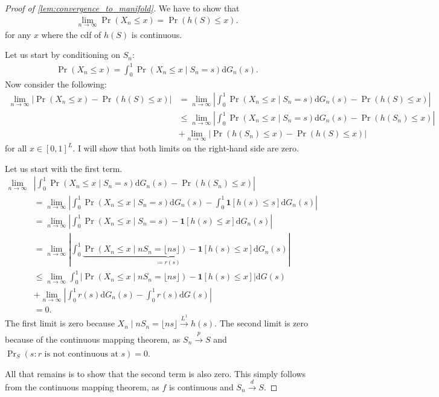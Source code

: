\documentclass[a4paper]{article}
\newcommand{\dG}{\mathrm{d}G}
\begin{document}
\begin{proof}[Proof of \cref{lem:convergence_to_manifold}]
    We have to show that
    \begin{align*}
        \lim_{n \to \infty} \Pr(X_n \leq x) = \Pr(h(S) \leq x).
    \end{align*}
    for any $x$ where the cdf of $h(S)$ is continuous.

    Let us start by conditioning on $S_n$:
    \begin{align*}
        \Pr(X_n \leq x) = \int_0^1 \Pr(X_n \leq x \mid S_n = s) \dG_n(s).
    \end{align*}
    Now consider the following:
    \begin{align*}
        \lim_{n \to \infty} \left| \Pr(X_n \leq x) - \Pr(h(S) \leq x) \right| &= \lim_{n \to \infty} \left| \int_0^1 \Pr(X_n \leq x \mid S_n = s) \dG_n(s) - \Pr(h(S) \leq x) \right| \\
        &\leq \lim_{n \to \infty} \left| \int_0^1 \Pr(X_n \leq x \mid S_n = s) \dG_n(s) - \Pr(h(S_n) \leq x) \right| \\
        &+ \lim_{n \to \infty} \left| \Pr(h(S_n) \leq x) - \Pr(h(S) \leq x) \right|
    \end{align*}
    for all $x \in [0, 1]^L$.
    I will show that both limits on the right-hand side are zero.

    Let us start with the first term.
    \begin{align*}
        \lim_{n \to \infty} &\left| \int_0^1 \Pr(X_n \leq x \mid S_n = s) \dG_n(s) - \Pr(h(S_n) \leq x) \right| \\
        &= \lim_{n \to \infty} \left| \int_0^1 \Pr(X_n \leq x \mid S_n = s) \dG_n(s) - \int_0^1 \mathbf{1}[h(s) \leq s] \dG_n(s) \right| \\
        &= \lim_{n \to \infty} \left| \int_0^1 \Pr(X_n \leq x \mid S_n = s) - \mathbf{1}[h(s) \leq x] \dG_n(s) \right| \\
        &= \lim_{n \to \infty} \left| \int_0^1 \underbrace{\Pr(X_n \leq x \mid nS_n = \lfloor ns \rfloor) - \mathbf{1}[h(s) \leq x]}_{\coloneqq r(s)} \dG_n(s) \right| \\
        &\leq \lim_{n \to \infty} \int_0^1 \left| \Pr(X_n \leq x \mid nS_n = \lfloor ns \rfloor) - \mathbf{1}[h(s) \leq x] \right| \dG(s) \\
        &+ \lim_{n \to \infty} \left| \int_0^1 r(s) \dG_n(s) - \int_0^1 r(s) \dG(s) \right| \\
        &= 0.
    \end{align*}
    The first limit is zero because $X_n \mid n S_n = \lfloor ns \rfloor \xrightarrow[]{L^1} h(s)$.
    The second limit is zero because of the continuous mapping theorem, as $S_n \xrightarrow[]{p} S$ and $\Pr_S(s : r\text{ is not continuous at }s)= 0$.

    All that remains is to show that the second term is also zero.
    This simply follows from the continuous mapping theorem, as $f$ is continuous and $S_n \xrightarrow[]{d} S$.
\end{proof}
\end{document}
